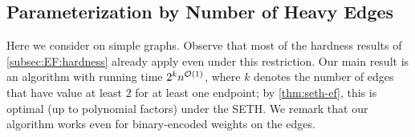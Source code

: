 \subsection{Parameterization by Number of Heavy Edges}\label{subsec:EFo_heavy}

Here we consider {\EFo} on simple graphs.
Observe that most of the hardness results of \cref{subsec:EF:hardness} already apply even under this restriction.
Our main result is an algorithm with running time $2^k n^{\mathcal{O}(1)}$,
where $k$ denotes the number of edges that have value at least $2$ for at least one endpoint;
by \cref{thm:seth-ef}, this is optimal (up to polynomial factors) under the SETH.
We remark that our algorithm works even for binary-encoded weights on the edges.

